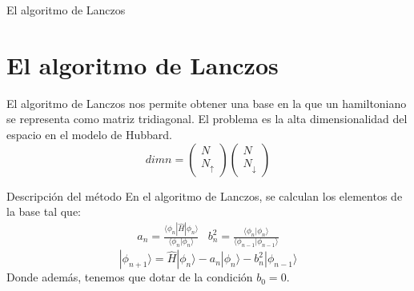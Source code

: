 \documentclass{beamer}
\begin{document}
\begin{frame}{El algoritmo de Lanczos \cite{RevModPhys.66.763} \cite{GreeneDiniz2024}}
    \section{El algoritmo de Lanczos}
    El algoritmo de Lanczos nos permite obtener una base en la que un hamiltoniano se representa como matriz tridiagonal. El problema es la alta dimensionalidad del espacio en el modelo de Hubbard.
    $$
    dimn = \left(\begin{array}{c}
    N \\
    N_{\uparrow}
    \end{array}\right)\left(\begin{array}{c}
    N \\
    N_{\downarrow}
    \end{array}\right)
    $$
    \begin{block}{Descripción del método}
        En el algoritmo de Lanczos, se calculan los elementos de la base tal que:
        \begin{equation}
            \begin{array}{cc}
                a_n = \frac{\langle\phi_n|\hat{H}|\phi_n\rangle}{\langle\phi_n|\phi_n\rangle} & b_n^2 = \frac{\langle\phi_n|\phi_n\rangle}{\langle\phi_{n-1}|\phi_{n-1}\rangle}
            \end{array}
    \end{equation}
    \begin{equation}
        |\phi_{n+1}\rangle = \hat{H}|\phi_n\rangle - a_n|\phi_n\rangle - b_n^2|\phi_{n-1}\rangle
    \end{equation}
    Donde además, tenemos que dotar de la condición $b_0 = 0$.
    \end{block}
\end{frame}
\end{document}
